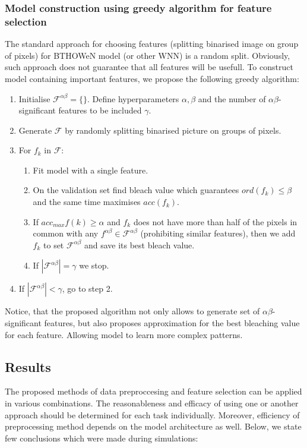 \documentclass{article}[12pt]
\begin{document}
\subsubsection{Model construction using greedy algorithm for feature selection}
The standard approach for choosing features (splitting binarised image on group of pixels) for BTHOWeN model (or other WNN) is a random split. Obviously, such approach does not guarantee that all features will be usefull. To construct model containing important features, we propose the following greedy algorithm:
\begin{enumerate}
    \item Initialise $\mathcal{F}^{\alpha\beta} = \{\}$. Define hyperparameters $\alpha, \beta$ and the number of $\alpha\beta$-significant features to be included $\gamma$.
    \item Generate $\mathcal{F}$ by randomly splitting binarised picture on groups of pixels.
    \item For $f_k$ in $\mathcal{F}$:
    \begin{enumerate}
        \item Fit model with a single feature.
        \item On the validation set find bleach value which guarantees $ord(f_k) \le \beta$ and the same time maximises $acc(f_k)$.
        \item If $acc_{max}f(k) \ge \alpha$ and $f_k$ does not have more than half of the pixels in common with any $f^{\alpha\beta}\in\mathcal{F}^{\alpha\beta}$ (prohibiting  similar features), then we add $f_k$ to set $\mathcal{F}^{\alpha\beta}$ and save its best bleach value.
        \item If $|\mathcal{F}^{\alpha\beta}| = \gamma$ we stop.
    \end{enumerate}
    \item If $|\mathcal{F}^{\alpha\beta}| < \gamma$, go to step 2.
\end{enumerate}
Notice, that the proposed algorithm not only allows to generate set of $\alpha\beta$-significant features, but also proposes approximation for the best bleaching value for each feature. Allowing model to learn more complex patterns.

\subsection{Results}
The proposed methods of data preproccesing and feature selection can be applied in various combinations. The reasonableness and efficacy of using one or another approach should be determined for each task individually. Moreover, efficiency of preprocessing method depends on the model architecture as well. Below, we state few conclusions which were made during simulations:
\end{document}
